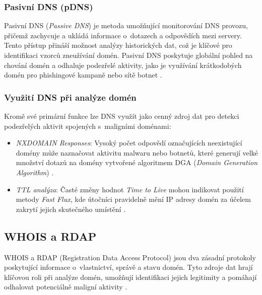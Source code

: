 \subsubsection*{Pasivní DNS (pDNS)}
Pasivní DNS (\emph{Passive DNS}) je metoda umožňující monitorování DNS provozu, přičemž zachycuje a ukládá informace o~dotazech a odpovědích mezi servery. Tento přístup přináší možnost analýzy historických dat, což je klíčové pro identifikaci vzorců zneužívání domén. Pasivní DNS poskytuje globální pohled na chování domén a odhaluje podezřelé aktivity, jako je využívání krátkodobých domén pro phishingové kampaně nebo sítě botnet \cite{silveira2021detection}.

\subsubsection*{Využití DNS při analýze domén}
Kromě své primární funkce lze DNS využít jako cenný zdroj dat pro detekci podezřelých aktivit spojených s~maligními doménami:
\begin{itemize}
    \item \emph{NXDOMAIN Responses}: Vysoký počet odpovědí označujících neexistující domény může naznačovat aktivitu malwaru nebo botnetů, které generují velké množství dotazů na domény vytvořené algoritmem DGA (\emph{Domain Generation Algorithm}) \cite{zou2019detecting}.
    \item \emph{TTL analýza}: Časté změny hodnot \emph{Time to Live} mohou indikovat použití metody \emph{Fast Flux}, kde útočníci pravidelně mění IP adresy domén za účelem zakrytí jejich skutečného umístění \cite{silveira2021detection}.
\end{itemize}


\subsection{WHOIS a RDAP}
WHOIS a RDAP (Registration Data Access Protocol) jsou dva zásadní protokoly poskytující informace o~vlastnictví, správě a stavu domén. Tyto zdroje dat hrají klíčovou roli při analýze domén, umožňují identifikaci jejich legitimity a pomáhají odhalovat potenciálně maligní aktivity \cite{shah2021rdap, campos2019rdap}.

